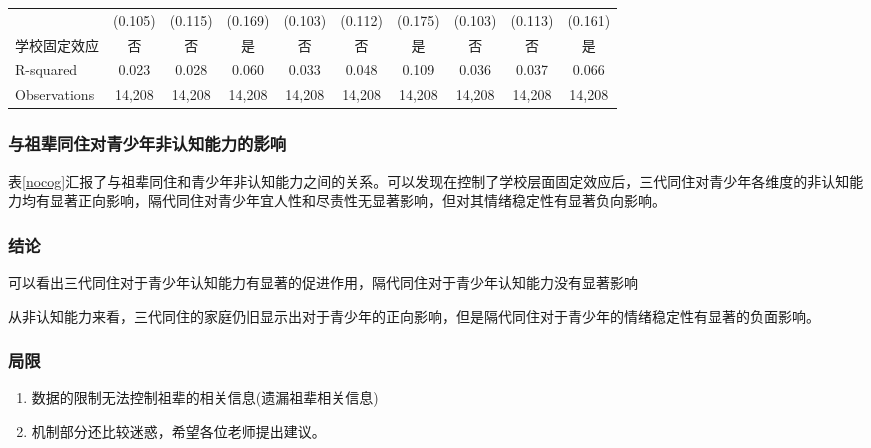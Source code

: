 \documentclass{beamer}
\begin{document}
\begin{frame}
\begin{table}[!htbp]
{\begin{tabular}{lccccccccc}
             & (0.105)    & (0.115)    & (0.169)    & (0.103)    & (0.112)    & (0.175)   & (0.103)    & (0.113)    & (0.161)    \\
学校固定效应       & 否          & 否          & 是          & 否          & 否          & 是         & 否          & 否          & 是          \\
R-squared    & 0.023      & 0.028      & 0.060      & 0.033      & 0.048      & 0.109     & 0.036      & 0.037      & 0.066      \\
Observations & 14,208     & 14,208     & 14,208     & 14,208     & 14,208     & 14,208    & 14,208     & 14,208     & 14,208   \\
\hline
\end{tabular}} %
\end{table}	
\end{frame}

\begin{frame}
	\frametitle{与祖辈同住对青少年非认知能力的影响}
表\ref{nocog}汇报了与祖辈同住和青少年非认知能力之间的关系。可以发现在控制了学校层面固定效应后，三代同住对青少年各维度的非认知能力均有显著正向影响，隔代同住对青少年宜人性和尽责性无显著影响，但对其情绪稳定性有显著负向影响。
\end{frame}


\begin{frame}
	\frametitle{结论}
可以看出三代同住对于青少年认知能力有显著的促进作用，隔代同住对于青少年认知能力没有显著影响
\par 从非认知能力来看，三代同住的家庭仍旧显示出对于青少年的正向影响，但是隔代同住对于青少年的情绪稳定性有显著的负面影响。

\end{frame}







\begin{frame}
	\frametitle{局限}
	\begin{enumerate}
		\item 数据的限制无法控制祖辈的相关信息(遗漏祖辈相关信息)
		\item 机制部分还比较迷惑，希望各位老师提出建议。
	\end{enumerate}
\end{frame}
\end{document}
